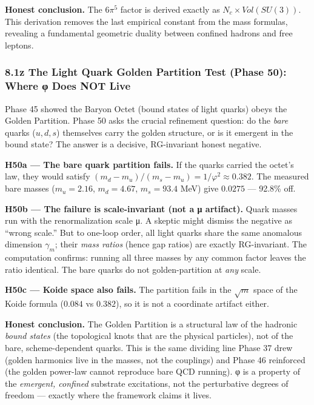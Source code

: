 \documentclass[
]{article}
\begin{document}
\textbf{Honest conclusion.} The \(6\pi^5\) factor is derived exactly as
\(N_c \times Vol(SU(3))\). This derivation removes the last empirical
constant from the mass formulas, revealing a fundamental geometric
duality between confined hadrons and free leptons.

\subsubsection{8.1z The Light Quark Golden Partition Test (Phase 50):
Where φ Does NOT
Live}\label{z-the-light-quark-golden-partition-test-phase-50-where-ux3c6-does-not-live}

Phase 45 showed the Baryon Octet (bound states of light quarks) obeys
the Golden Partition. Phase 50 asks the crucial refinement question: do
the \emph{bare} quarks (\(u, d, s\)) themselves carry the golden
structure, or is it emergent in the bound state? The answer is a
decisive, RG-invariant honest negative.

\textbf{H50a --- The bare quark partition fails.} If the quarks carried
the octet's law, they would satisfy
\((m_d - m_u)/(m_s - m_u) = 1/\varphi^2 \approx 0.382\). The measured
bare masses (\(m_u=2.16\), \(m_d=4.67\), \(m_s=93.4\) MeV) give
\(0.0275\) --- 92.8\% off.

\textbf{H50b --- The failure is scale-invariant (not a μ artifact).}
Quark masses run with the renormalization scale μ. A skeptic might
dismiss the negative as ``wrong scale.'' But to one-loop order, all
light quarks share the same anomalous dimension \(\gamma_m\); their
\emph{mass ratios} (hence gap ratios) are exactly RG-invariant. The
computation confirms: running all three masses by any common factor
leaves the ratio identical. The bare quarks do not golden-partition at
\emph{any} scale.

\textbf{H50c --- Koide space also fails.} The partition fails in the
\(\sqrt{m}\) space of the Koide formula (\(0.084\) vs \(0.382\)), so it
is not a coordinate artifact either.

\textbf{Honest conclusion.} The Golden Partition is a structural law of
the hadronic \emph{bound states} (the topological knots that are the
physical particles), not of the bare, scheme-dependent quarks. This is
the same dividing line Phase 37 drew (golden harmonics live in the
masses, not the couplings) and Phase 46 reinforced (the golden power-law
cannot reproduce bare QCD running). φ is a property of the
\emph{emergent, confined} substrate excitations, not the perturbative
degrees of freedom --- exactly where the framework claims it lives.
\end{document}
